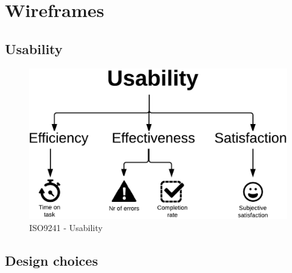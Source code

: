\section{Wireframes}
\label{sec:wireframes}


  \subsection{Usability}

  \begin{figure}[H]
    \centering
    \includegraphics[scale=0.25]{pics/usability.png}
    \caption[ISO9241 - Usability]{ISO9241 - Usability \cite{ISO9241}}
    \label{fig:usability}
  \end{figure}

  \subsection{Design choices}


